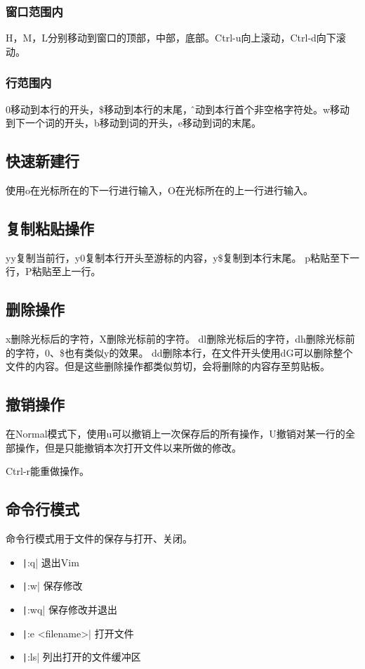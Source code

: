 \documentclass[fontset=ubuntu]{ctexart}
\begin{document}
\begin{sloppypar}
\subsubsection{窗口范围内}
H，M，L分别移动到窗口的顶部，中部，底部。Ctrl-u向上滚动，Ctrl-d向下滚动。

\subsubsection{行范围内}
0移动到本行的开头，\$移动到本行的末尾，\^移动到本行首个非空格字符处。w移动到下一个词的开头，b移动到词的开头，e移动到词的末尾。

\subsection{快速新建行}
使用o在光标所在的下一行进行输入，O在光标所在的上一行进行输入。

\subsection{复制粘贴操作}
yy复制当前行，y0复制本行开头至游标的内容，y\$复制到本行末尾。
p粘贴至下一行，P粘贴至上一行。

\subsection{删除操作}
x删除光标后的字符，X删除光标前的字符。
dl删除光标后的字符，dh删除光标前的字符，0、\$也有类似y的效果。
dd删除本行，在文件开头使用dG可以删除整个文件的内容。但是这些删除操作都类似剪切，会将删除的内容存至剪贴板。

\subsection{撤销操作}
在Normal模式下，使用u可以撤销上一次保存后的所有操作，U撤销对某一行的全部操作，但是只能撤销本次打开文件以来所做的修改。

Ctrl-r能重做操作。

\subsection{命令行模式}
命令行模式用于文件的保存与打开、关闭。
\begin{itemize}
    \item \texttt|:q| 退出Vim
    \item \texttt|:w| 保存修改
    \item \texttt|:wq| 保存修改并退出
    \item \texttt|:e <filename>| 打开文件
    \item \texttt|:ls| 列出打开的文件缓冲区
\end{itemize}


\end{sloppypar}
\end{document}
